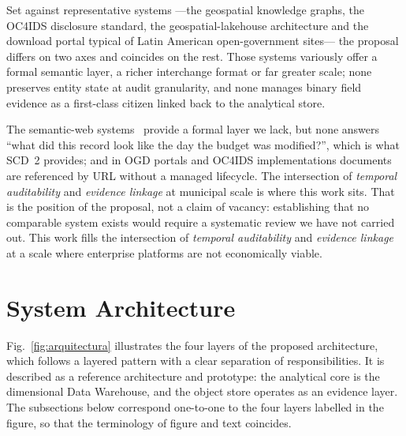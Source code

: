 \documentclass[runningheads]{llncs}
\renewcommand{\_}{\origunderscore\allowbreak}
\begin{document}
\begingroup
Set against representative systems ---the geospatial knowledge graphs, the OC4IDS disclosure standard, the geospatial-lakehouse architecture and the download portal typical of Latin American open-government sites--- the proposal differs on two axes and coincides on the rest. Those systems variously offer a formal semantic layer, a richer interchange format or far greater scale; none preserves entity state at audit granularity, and none manages binary field evidence as a first-class citizen linked back to the analytical store.

The semantic-web systems~\cite{Janowicz2022,Poveda2020,Rajabi2023} provide a formal layer we lack, but none answers ``what did this record look like the day the budget was modified?'', which is what SCD~2 provides; and in OGD portals and OC4IDS implementations documents are referenced by URL without a managed lifecycle. The intersection of \emph{temporal auditability} and \emph{evidence linkage} at municipal scale is where this work sits. That is the position of the proposal, not a claim of vacancy: establishing that no comparable system exists would require a systematic review we have not carried out. This work fills the intersection of \emph{temporal auditability} and \emph{evidence linkage} at a scale where enterprise platforms are not economically viable.
\endgroup


\section{System Architecture}
\label{sec:arquitectura}

Fig.~\ref{fig:arquitectura} illustrates the four layers of the proposed architecture, which follows a layered pattern with a clear separation of responsibilities. It is described as a reference architecture and prototype: the analytical core is the dimensional Data Warehouse, and the object store operates as an evidence layer. The subsections below correspond one-to-one to the four layers labelled in the figure, so that the terminology of figure and text coincides.
\end{document}
